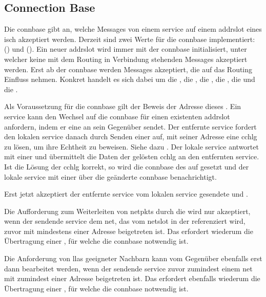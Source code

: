 \subsection{Connection Base}
Die \gls{connbase} gibt an, welche Messages von einem \gls{service} auf einem \gls{addrslot} eines
\gls{isch} akzeptiert werden. Derzeit sind zwei Werte für die \gls{connbase} implementiert:
 () und  ().
Ein neuer \gls{addrslot} wird immer mit der \gls{connbase}  initialisiert, unter
welcher keine mit dem Routing in Verbindung stehenden Messages akzeptiert werden.
Erst ab der \gls{connbase}  werden Messages akzeptiert, die auf
das Routing Einfluss nehmen.
Konkret handelt es sich dabei um die \msg{\isprotonjn}, die \msg{\isprotonln},
die \msg{\isprotonp}, die \msg{\isprotoireq}, die \msg{\isprotoacsa} und die
\msg{\isprotoacd}.

Als Voraussetzung für die \gls{connbase}  gilt der Beweis der Adresse dieses
. Ein \gls{service} kann den Wechsel auf die \gls{connbase}
 für einen existenten \gls{addrslot} anfordern, indem er eine \msg{\isprotots}
an sein Gegenüber sendet.
Der entfernte \gls{service} fordert den lokalen \gls{service} danach durch Senden einer
\msg{\isprotoccreq} auf, mit seiner Adresse eine \gls{cchlg} zu lösen, um ihre Echtheit zu
beweisen. Siehe dazu .
Der lokale \gls{service} antwortet mit einer \msg{\isprotoccrep} und übermittelt die Daten der
gelösten \gls{cchlg} an den entfernten \gls{service}.
Ist die Lösung der \gls{cchlg} korrekt, so wird die \gls{connbase} des
 auf  gesetzt und der lokale \gls{service} mit
einer \msg{\isprotocbn} über die geänderte \gls{connbase} benachrichtigt.

Erst jetzt akzeptiert der entfernte \gls{service} vom lokalen \gls{service} gesendete
\msgpl{\isprotonjn} und \msgpl{\isprotonln}.

Die Aufforderung zum Weiterleiten von \glspl{netpkt} durch die \msg{\isprotonp} wird nur
akzeptiert, wenn der sendende \gls{service} dem \gls{net}, das vom \gls{netslot} in der
\msg{\isprotonp} referenziert wird, zuvor mit mindestens einer Adresse beigetreten ist.
Das erfordert wiederum die Übertragung einer \msg{\isprotonjn}, für welche die \gls{connbase}
 notwendig ist.

Die Anforderung von \glspl{lla} geeigneter Nachbarn kann vom Gegenüber ebenfalls erst dann
bearbeitet werden, wenn der sendende \gls{service} zuvor zumindest einem \gls{net} mit zumindest
einer Adresse beigetreten ist.
Das erfordert ebenfalls wiederum die Übertragung einer \msg{\isprotonjn}, für welche die
\gls{connbase}  notwendig ist.

